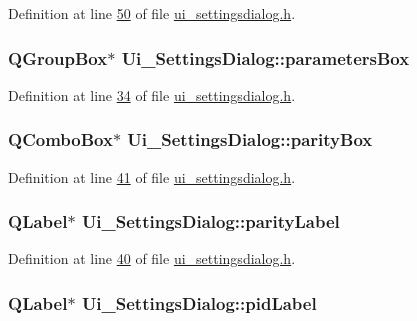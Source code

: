 Definition at line \hyperlink{a00054_source_l00050}{50} of file \hyperlink{a00054_source}{ui\+\_\+settingsdialog.\+h}.

\hypertarget{a00029_a47cebbe70a990bd1f309250101022889}{
\subsubsection[{parameters\+Box}]{\setlength{\rightskip}{0pt plus 5cm}Q\+Group\+Box$\ast$ Ui\+\_\+\+Settings\+Dialog\+::parameters\+Box}}\label{a00029_a47cebbe70a990bd1f309250101022889}


Definition at line \hyperlink{a00054_source_l00034}{34} of file \hyperlink{a00054_source}{ui\+\_\+settingsdialog.\+h}.

\hypertarget{a00029_a88c0b5d1f96a308ab115937b090f7bba}{
\subsubsection[{parity\+Box}]{\setlength{\rightskip}{0pt plus 5cm}Q\+Combo\+Box$\ast$ Ui\+\_\+\+Settings\+Dialog\+::parity\+Box}}\label{a00029_a88c0b5d1f96a308ab115937b090f7bba}


Definition at line \hyperlink{a00054_source_l00041}{41} of file \hyperlink{a00054_source}{ui\+\_\+settingsdialog.\+h}.

\hypertarget{a00029_ae062846ca8db471d7eb362ae39123422}{
\subsubsection[{parity\+Label}]{\setlength{\rightskip}{0pt plus 5cm}Q\+Label$\ast$ Ui\+\_\+\+Settings\+Dialog\+::parity\+Label}}\label{a00029_ae062846ca8db471d7eb362ae39123422}


Definition at line \hyperlink{a00054_source_l00040}{40} of file \hyperlink{a00054_source}{ui\+\_\+settingsdialog.\+h}.

\hypertarget{a00029_a8ad53ddf3a11421d99dfa6fec8c92cfc}{
\subsubsection[{pid\+Label}]{\setlength{\rightskip}{0pt plus 5cm}Q\+Label$\ast$ Ui\+\_\+\+Settings\+Dialog\+::pid\+Label}}\label{a00029_a8ad53ddf3a11421d99dfa6fec8c92cfc}


